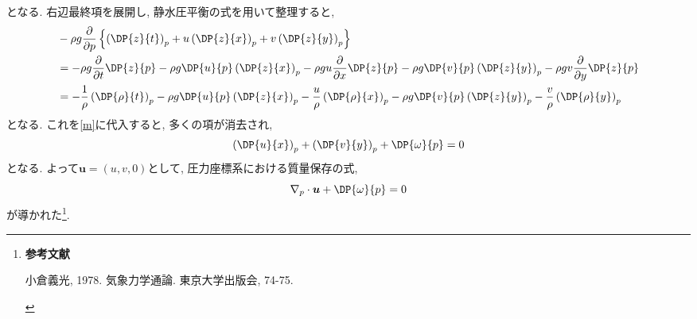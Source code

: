 \documentclass[a4j,12pt,openbib,oneside,dvipdfmx]{jarticle}
\begin{document}
となる. 右辺最終項を展開し, 静水圧平衡の式を用いて整理すると,
\begin{align}
  &-\rho{g}\frac{\partial}{\partial{p}}\left\{\left(\DP{z}{t}\right)_p+u\left(\DP{z}{x}\right)_p+v\left(\DP{z}{y}\right)_p\right\} \nonumber \\
  &=-\rho{g}\frac{\partial}{\partial{t}}\DP{z}{p}-\rho{g}\DP{u}{p}\left(\DP{z}{x}\right)_p-\rho{g}u\frac{\partial}{\partial{x}}\DP{z}{p}-\rho{g}\DP{v}{p}\left(\DP{z}{y}\right)_p-\rho{g}v\frac{\partial}{\partial{y}}\DP{z}{p}\nonumber\nonumber \\
  &=-\frac{1}{\rho}\left(\DP{\rho}{t}\right)_p-\rho{g}\DP{u}{p}\left(\DP{z}{x}\right)_p-\frac{u}{\rho}\left(\DP{\rho}{x}\right)_p-\rho{g}\DP{v}{p}\left(\DP{z}{y}\right)_p-\frac{v}{\rho}\left(\DP{\rho}{y}\right)_p
\end{align}
となる. これを\eqref{m}に代入すると, 多くの項が消去され, 
\begin{equation}
  \left(\DP{u}{x}\right)_p+\left(\DP{v}{y}\right)_p+\DP{\omega}{p}=0
\end{equation}
となる. よって$\bm{u}=(u,v,0)$として, 圧力座標系における質量保存の式,
\begin{equation}
  \nabla_p\cdot\bm{u}+\DP{\omega}{p}=0
\end{equation}
が導かれた\footnote{
{\bfseries 参考文献}
\begin{description}
  \item {小倉義光, 1978. 気象力学通論. 東京大学出版会, 74-75. }
\end{description}
}.

\newpage
\appendix
\end{document}
